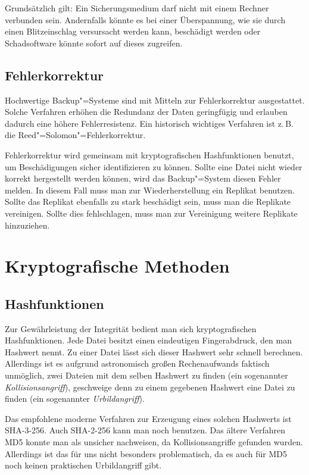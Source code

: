 \documentclass[a4paper,11pt,fleqn,twocolumn,twoside]{scrartcl}
\begin{document}
Grundsätzlich gilt: Ein Sicherungsmedium darf nicht mit einem Rechner
verbunden sein. Andernfalls könnte es bei einer Überspannung, wie sie
durch einen Blitzeinschlag versursacht werden kann, beschädigt werden
oder Schadsoftware könnte sofort auf dieses zugreifen.

\subsection{Fehlerkorrektur}

Hochwertige Backup"=Systeme sind mit Mitteln zur Fehlerkorrektur
ausgestattet. Solche Verfahren erhöhen die Redundanz der Daten
geringfügig und erlauben dadurch eine höhere Fehlerresistenz.
Ein historisch wichtiges Verfahren ist z.\,B.
die Reed"=Solomon"=Fehlerkorrektur.

Fehlerkorrektur wird gemeinsam mit kryptografischen Hashfunktionen
benutzt, um Beschädigungen sicher identifizieren zu können. Sollte
eine Datei nicht wieder korrekt hergestellt werden können, wird das
Backup"=System diesen Fehler melden. In diesem Fall muss man zur
Wiederherstellung ein Replikat benutzen. Sollte das Replikat
ebenfalls zu stark beschädigt sein, muss man die Replikate
vereinigen. Sollte dies fehlschlagen, muss man zur Vereinigung
weitere Replikate hinzuziehen.

\section{Kryptografische Methoden}

\subsection{Hashfunktionen}

Zur Gewährleistung der Integrität bedient man sich kryptografischen
Hashfunktionen. Jede Datei besitzt einen eindeutigen Fingerabdruck,
den man Hashwert nennt. Zu einer Datei lässt sich dieser Hashwert
sehr schnell berechnen. Allerdings ist es aufgrund astronomisch großen
Rechenaufwands faktisch unmöglich, zwei Dateien mit dem selben Hashwert
zu finden (ein sogenannter \emph{Kollisionsangriff}), geschweige denn
zu einem gegebenen Hashwert eine Datei zu finden (ein sogenannter
\emph{Urbildangriff}).

Das empfohlene moderne Verfahren zur Erzeugung eines solchen
Hashwerts ist SHA-3-256. Auch SHA-2-256 kann man noch
benutzen. Das ältere Verfahren MD5 konnte man als unsicher
nachweisen, da Kollisionsangriffe gefunden wurden. Allerdings
ist das für uns nicht besonders problematisch, da es auch für MD5
noch keinen praktischen Urbildangriff gibt.
\end{document}
